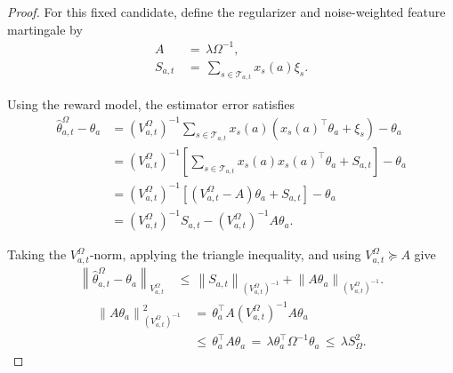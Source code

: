 \documentclass{article} %
\begin{document}
\begin{proof}
For this fixed candidate, define the regularizer and noise-weighted feature
martingale by
\begin{align}
A
&\,=\,
\lambda\Omega^{-1},
\label{eq:hyper-sn-proof-A}
\\
S_{a,t}
&\,=\,
\sum_{s\in\mathcal{T}_{a,t}}
x_s(a)\xi_s.
\label{eq:hyper-sn-proof-S}
\end{align}

Using the reward model, the estimator error satisfies
\begin{equation}
\label{eq:hyper-sn-proof-error}
\begin{aligned}
\widehat{\theta}_{a,t}^{\Omega}-\theta_a
&=
\left(V_{a,t}^{\Omega}\right)^{-1}
\sum_{s\in\mathcal{T}_{a,t}}
x_s(a)
\left(x_s(a)^\top\theta_a+\xi_s\right)
-\theta_a
\\
&=
\left(V_{a,t}^{\Omega}\right)^{-1}
\left[
\sum_{s\in\mathcal{T}_{a,t}}
x_s(a)x_s(a)^\top\theta_a
+
S_{a,t}
\right]
-\theta_a
\\
&=
\left(V_{a,t}^{\Omega}\right)^{-1}
\left[
\left(V_{a,t}^{\Omega}-A\right)\theta_a
+
S_{a,t}
\right]
-\theta_a
\\
&=
\left(V_{a,t}^{\Omega}\right)^{-1}
S_{a,t}
-
\left(V_{a,t}^{\Omega}\right)^{-1}
A\theta_a .
\end{aligned}
\end{equation}

Taking the \(V_{a,t}^{\Omega}\)-norm, applying the triangle inequality, and
using \(V_{a,t}^{\Omega}\succeq A\) give
\begin{equation}
\label{eq:hyper-sn-proof-triangle}
\begin{aligned}
\left\|
\widehat{\theta}_{a,t}^{\Omega}-\theta_a
\right\|_{V_{a,t}^{\Omega}}
&\,\leq\,
\left\|
S_{a,t}
\right\|_{\left(V_{a,t}^{\Omega}\right)^{-1}}
+
\left\|
A\theta_a
\right\|_{\left(V_{a,t}^{\Omega}\right)^{-1}} .
\end{aligned}
\end{equation}
\begin{equation}
\label{eq:hyper-sn-proof-bias}
\begin{aligned}
\left\|
A\theta_a
\right\|_{\left(V_{a,t}^{\Omega}\right)^{-1}}^2
&\,=\,
\theta_a^\top A
\left(V_{a,t}^{\Omega}\right)^{-1}
A\theta_a
\\
&\,\leq\,
\theta_a^\top A\theta_a
\,=\,
\lambda\theta_a^\top\Omega^{-1}\theta_a
\,\leq\,
\lambda S_{\Omega}^2.
\end{aligned}
\end{equation}


\end{proof}
\end{document}
